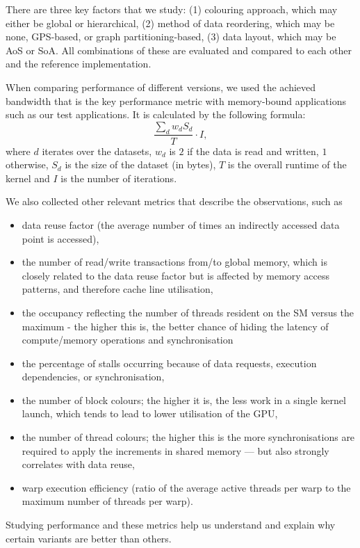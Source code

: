There are three key factors that we study: (1) colouring approach, which may either be global or hierarchical, (2) method of data reordering, which may be none, GPS-based, or graph partitioning-based, (3) data layout, which may be AoS or SoA. All combinations of these are evaluated and compared to each other and the reference implementation.

When comparing performance of different versions, we used the achieved bandwidth
that is the key performance metric with memory-bound applications such as our
test applications. It is calculated by the following formula: $$\frac{\sum_{d}
w_dS_d}{T} \cdot I,$$ where $d$ iterates over the datasets, $w_d$ is $2$ if the
data is read and written, $1$ otherwise, $S_d$ is the size of the dataset (in
bytes), $T$ is the overall runtime of the kernel and $I$ is the number of
iterations.

We also collected other relevant metrics that describe the observations, such as 
\begin{itemize}
  \item data reuse factor (the average number of times an indirectly accessed
    data point is accessed),
  \item the number of read/write transactions from/to global memory, which is
    closely related to the data reuse factor but is affected by memory access
    patterns, and therefore cache line utilisation,
  \item the occupancy reflecting the number of threads resident on the SM versus
    the maximum - the higher this is, the better chance of hiding the latency of
    compute/memory operations and synchronisation
  \item the percentage of stalls occurring because of data requests, execution
    dependencies, or synchronisation,
   \item the number of block colours; the higher it is, the less work in a
     single kernel launch, which tends to lead to lower utilisation of the GPU,
  \item the number of thread colours; the higher this is the more
    synchronisations are required to apply the increments in shared memory ---
    but also strongly correlates with data reuse,
  \item warp execution efficiency (ratio of the average active threads per warp
    to the maximum number of threads per warp).
\end{itemize}
Studying performance and these metrics help us understand and explain why
certain variants are better than others.

